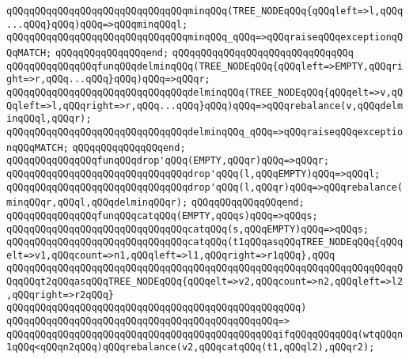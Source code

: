 \verb|qQQqqQQqqQQqqQQqqQQqqQQqqQQqqQQqminqQQq(TREE_NODEqQQq{qQQqleft=>l,qQQq...qQQq}qQQq)qQQq=>qQQqminqQQql;|\newline
\verb|qQQqqQQqqQQqqQQqqQQqqQQqqQQqqQQqminqQQq_qQQq=>qQQqraiseqQQqexceptionqQQqMATCH;|\newline
\verb|qQQqqQQqqQQqqQQqend;|\newline
\verb|qQQqqQQqqQQqqQQqqQQqqQQqqQQqqQQq|\newline
\verb|qQQqqQQqqQQqqQQqfunqQQqdelminqQQq(TREE_NODEqQQq{qQQqleft=>EMPTY,qQQqright=>r,qQQq...qQQq}qQQq)qQQq=>qQQqr;|\newline
\verb|qQQqqQQqqQQqqQQqqQQqqQQqqQQqqQQqdelminqQQq(TREE_NODEqQQq{qQQqelt=>v,qQQqleft=>l,qQQqright=>r,qQQq...qQQq}qQQq)qQQq=>qQQqrebalance(v,qQQqdelminqQQql,qQQqr);|\newline
\verb|qQQqqQQqqQQqqQQqqQQqqQQqqQQqqQQqdelminqQQq_qQQq=>qQQqraiseqQQqexceptionqQQqMATCH;|\newline
\verb|qQQqqQQqqQQqqQQqend;|\newline
\newline
\verb|qQQqqQQqqQQqqQQqfunqQQqdrop'qQQq(EMPTY,qQQqr)qQQq=>qQQqr;|\newline
\verb|qQQqqQQqqQQqqQQqqQQqqQQqqQQqqQQqdrop'qQQq(l,qQQqEMPTY)qQQq=>qQQql;|\newline
\verb|qQQqqQQqqQQqqQQqqQQqqQQqqQQqqQQqdrop'qQQq(l,qQQqr)qQQq=>qQQqrebalance(minqQQqr,qQQql,qQQqdelminqQQqr);|\newline
\verb|qQQqqQQqqQQqqQQqend;|\newline
\newline
\verb|qQQqqQQqqQQqqQQqfunqQQqcatqQQq(EMPTY,qQQqs)qQQq=>qQQqs;|\newline
\verb|qQQqqQQqqQQqqQQqqQQqqQQqqQQqqQQqcatqQQq(s,qQQqEMPTY)qQQq=>qQQqs;|\newline
\newline
\verb|qQQqqQQqqQQqqQQqqQQqqQQqqQQqqQQqcatqQQq(t1qQQqasqQQqTREE_NODEqQQq{qQQqelt=>v1,qQQqcount=>n1,qQQqleft=>l1,qQQqright=>r1qQQq},qQQq|\newline
\verb|qQQqqQQqqQQqqQQqqQQqqQQqqQQqqQQqqQQqqQQqqQQqqQQqqQQqqQQqqQQqqQQqqQQqqQQqqQQqt2qQQqasqQQqTREE_NODEqQQq{qQQqelt=>v2,qQQqcount=>n2,qQQqleft=>l2,qQQqright=>r2qQQq}|\newline
\verb|qQQqqQQqqQQqqQQqqQQqqQQqqQQqqQQqqQQqqQQqqQQqqQQqqQQq)|\newline
\verb|qQQqqQQqqQQqqQQqqQQqqQQqqQQqqQQqqQQqqQQqqQQqqQQq=>|\newline
\verb|qQQqqQQqqQQqqQQqqQQqqQQqqQQqqQQqqQQqqQQqqQQqqQQqifqQQqqQQqqQQq(wtqQQqn1qQQq<qQQqn2qQQq)qQQqrebalance(v2,qQQqcatqQQq(t1,qQQql2),qQQqr2);|\newline
